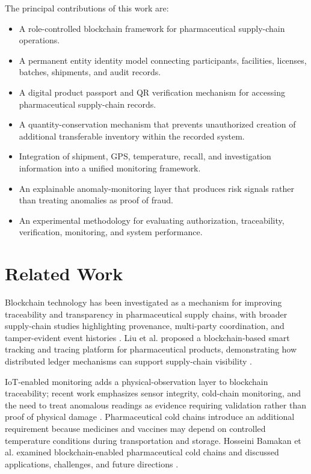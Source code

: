 \documentclass[11pt,a4paper]{article}
\begin{document}
The principal contributions of this work are:
\begin{itemize}
    \item A role-controlled blockchain framework for pharmaceutical supply-chain operations.
    \item A permanent entity identity model connecting participants, facilities, licenses, batches, shipments, and audit records.
    \item A digital product passport and QR verification mechanism for accessing pharmaceutical supply-chain records.
    \item A quantity-conservation mechanism that prevents unauthorized creation of additional transferable inventory within the recorded system.
    \item Integration of shipment, GPS, temperature, recall, and investigation information into a unified monitoring framework.
    \item An explainable anomaly-monitoring layer that produces risk signals rather than treating anomalies as proof of fraud.
    \item An experimental methodology for evaluating authorization, traceability, verification, monitoring, and system performance.
\end{itemize}

\section{Related Work}
Blockchain technology has been investigated as a mechanism for improving traceability and transparency in pharmaceutical supply chains, with broader supply-chain studies highlighting provenance, multi-party coordination, and tamper-evident event histories \cite{nakamoto2008bitcoin,szabo1997formalizing,crosby2016blockchain,casino2019systematic,kamilaris2019rise,saberi2019blockchain,queiroz2020blockchain,wang2019understanding}. Liu et al. proposed a blockchain-based smart tracking and tracing platform for pharmaceutical products, demonstrating how distributed ledger mechanisms can support supply-chain visibility \cite{liu2021blockchain}.

IoT-enabled monitoring adds a physical-observation layer to blockchain traceability; recent work emphasizes sensor integrity, cold-chain monitoring, and the need to treat anomalous readings as evidence requiring validation rather than proof of physical damage \cite{yadav2022blockchain,antal2018blockchain,mutambik2026blockchain,securitythreats2026}. Pharmaceutical cold chains introduce an additional requirement because medicines and vaccines may depend on controlled temperature conditions during transportation and storage. Hosseini Bamakan et al. examined blockchain-enabled pharmaceutical cold chains and discussed applications, challenges, and future directions \cite{hosseini2021blockchain}.
\end{document}
